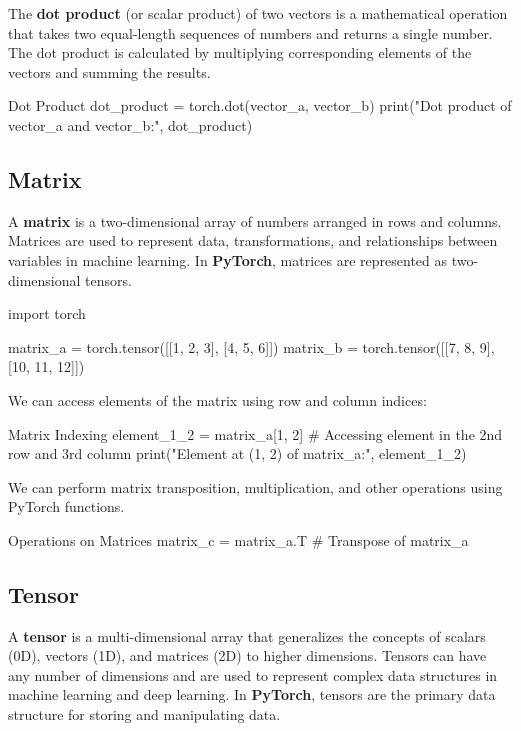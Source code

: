 The \textbf{dot product} (or scalar product) of two vectors is a mathematical operation that takes two equal-length sequences of numbers and returns a single number. The dot product is calculated by multiplying corresponding elements of the vectors and summing the results.

\begin{pythoncode}{Dot Product}
dot_product = torch.dot(vector_a, vector_b)
print("Dot product of vector_a and vector_b:", dot_product)
\end{pythoncode}



\subsection{Matrix}

A \textbf{matrix} is a two-dimensional array of numbers arranged in rows and columns. Matrices are used to represent data, transformations, and relationships between variables in machine learning. In \textbf{PyTorch}, matrices are represented as two-dimensional tensors.

\begin{pythoncode}
import torch

matrix_a = torch.tensor([[1, 2, 3], [4, 5, 6]])
matrix_b = torch.tensor([[7, 8, 9], [10, 11, 12]])
\end{pythoncode}

We can access elements of the matrix using row and column indices:

\begin{pythoncode}{Matrix Indexing}
element_1_2 = matrix_a[1, 2]  # Accessing element in the 2nd row and 3rd column
print("Element at (1, 2) of matrix_a:", element_1_2)
\end{pythoncode}

We can perform matrix transposition, multiplication, and other operations using PyTorch functions.

\begin{pythoncode}{Operations on Matrices}
matrix_c = matrix_a.T  # Transpose of matrix_a
\end{pythoncode}

\subsection{Tensor}

A \textbf{tensor} is a multi-dimensional array that generalizes the concepts of scalars (0D), vectors (1D), and matrices (2D) to higher dimensions. Tensors can have any number of dimensions and are used to represent complex data structures in machine learning and deep learning. In \textbf{PyTorch}, tensors are the primary data structure for storing and manipulating data.

